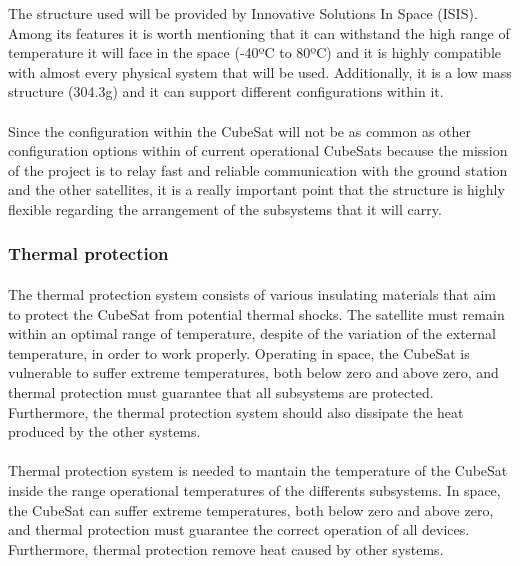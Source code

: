 The structure used will be provided by Innovative Solutions In Space (ISIS). Among its features it is worth mentioning that it can withstand the high range of temperature it will face in the space (-40ºC to 80ºC) and it is highly compatible with almost every physical system that will be used. Additionally, it is a low mass structure (304.3g) and it can support different configurations within it.

\paragraph{}Since the configuration within the CubeSat will not be as common as other configuration options within of current operational CubeSats because the mission of the project is to relay fast and reliable communication with the ground station and the other satellites, it is a really important point that the structure is highly flexible regarding the arrangement of the subsystems that it will carry.

\subsubsection{Thermal protection}
\paragraph{}The thermal protection system consists of various insulating materials that aim to protect the CubeSat from potential thermal shocks. The satellite must remain within an optimal range of temperature, despite of the variation of the external temperature, in order to work properly. Operating in space, the CubeSat is vulnerable to suffer extreme temperatures, both below zero and above zero, and thermal protection must guarantee that all subsystems are protected. Furthermore, the thermal protection system should also dissipate the heat produced by the other systems.

\paragraph{} Thermal protection system is needed to mantain the temperature of the CubeSat inside the range operational temperatures of the differents subsystems. In space, the CubeSat can suffer extreme temperatures, both below zero and above zero, and thermal protection must guarantee the correct operation of all devices. Furthermore, thermal protection remove heat caused by other systems.

